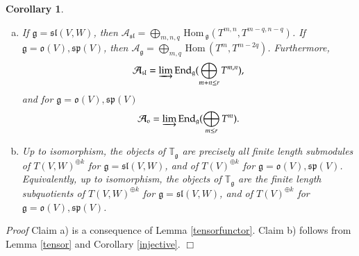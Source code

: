 \documentclass{svmult}
\newtheorem{cor}[theo]{Corollary}
\renewenvironment{proof}{ \emph{Proof}}{$\Box$}
\newcommand{\TT}{\mathbb{T}}
\renewcommand{\sp}{\mathfrak{sp}}
\renewcommand{\sl}{\mathfrak{sl}}
\newcommand{\oo}{\mathfrak{o}}
\renewcommand{\gg}{\mathfrak{g}}
\newcommand{\Hom}{\mathrm{Hom}}
\begin{document}
\vspace{0.5cm}
\begin{cor}\label{corr:1}
 \begin{enumerate}[a)]
  \item If $\gg = \sl(V,W)$, then $\mathcal A_\sl =    \bigoplus_{m,n,q}\,\Hom\,_{\gg}(T^{m,n},T^{m-q,n-q})$. 
If $\gg = \oo(V), \sp(V)$, then 
$\mathcal A_\gg = \bigoplus_{m,q}\,\Hom\,(T^m, T^{m-2q})$. Furthermore,
$$\mathcal A_{\sl}=\varinjlim\operatorname{End}_{\gg}(\bigoplus_{m+n\leq r}T^{m,n}),$$
and for $\gg = \oo(V), \sp(V)$
$$\mathcal A_{\oo}=\varinjlim\operatorname{End}_{\gg}(\bigoplus_{m\leq r}T^{m}).$$ 
  \item Up to isomorphism, the objects of $\TT_\gg$ are precisely all
    finite length submodules of $T(V,W)^{\oplus k}$ 
for $\gg = \sl(V,W)$, and of $T(V)^{\oplus k}$ 
for $\gg = \oo(V), \sp(V)$. Equivalently, up to isomorphism, the
objects of 
$\TT_\gg$ are the finite length subquotients of $T(V,W)^{\oplus k}$ for $\gg = \sl(V,W)$, 
and of $T(V)^{\oplus k}$ for $\gg = \oo(V), \sp(V)$.
 \end{enumerate}
\end{cor}
\begin{proof} Claim a) is a consequence of Lemma \ref{tensorfunctor}. 
Claim b) follows from Lemma \ref{tensor} and Corollary \ref{injective}.
\end{proof}
\end{document}
